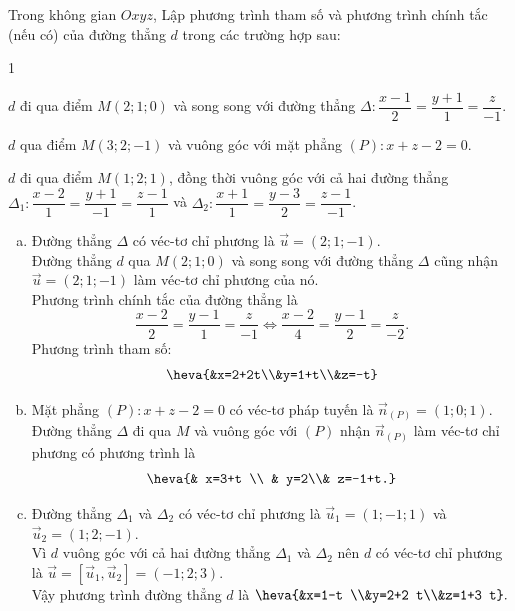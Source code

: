 \begin{vd}
	Trong không gian $Oxyz$, Lập phương trình tham số và phương trình chính tắc (nếu có) của đường thẳng $d$ trong các trường hợp sau:
	\begin{enumEX}[a)]{1}
		\item $d$ đi qua điểm $M(2;1;0)$ và song song với đường thẳng $\Delta \colon \dfrac{x-1}{2}=\dfrac{y+1}{1}=\dfrac{z}{-1}$.
		\item $d$ qua điểm $M(3;2;-1)$ và vuông góc với mặt phẳng $(P)\colon x+z-2=0$.
		\item $d$ đi qua điểm $M(1; 2; 1)$, đồng thời vuông góc với cả hai đường thẳng $\Delta_{1}\colon \dfrac{x-2}{1}=\dfrac{y+1}{-1}=\dfrac{z-1}{1}$ và $\Delta_{2}\colon \dfrac{x+1}{1}=\dfrac{y-3}{2}=\dfrac{z-1}{-1}$.
	\end{enumEX}

	\loigiai
	{
		\begin{enumerate}[a)]
			\item Đường thẳng $\Delta$ có véc-tơ chỉ phương là $\vec{u}=(2;1;-1)$.\\
			Đường thẳng $d$ qua $M(2;1;0)$ và song song với đường thẳng $\Delta$ cũng nhận $\vec{u}=(2;1;-1)$ làm véc-tơ chỉ phương của nó.\\
			Phương trình chính tắc của đường thẳng là
			\[\dfrac{x-2}{2}=\dfrac{y-1}{1}=\dfrac{z}{-1} \Leftrightarrow\dfrac{x-2}{4}=\dfrac{y-1}{2}=\dfrac{z}{-2}.\]
			Phương trình tham số:
			$$\heva{&x=2+2t\\&y=1+t\\&z=-t}$$
			\item Mặt phẳng $(P)\colon x+z-2=0$ có véc-tơ pháp tuyến là $\overrightarrow{n}_{(P)}=(1;0;1)$.\\
			Đường thẳng $\Delta$ đi qua $M$ và vuông góc với $(P)$ nhận $\overrightarrow{n}_{(P)}$ làm véc-tơ chỉ phương có phương trình là
			$$\heva{& x=3+t \\ & y=2\\& z=-1+t.}$$
			\item Đường thẳng $\Delta_{1}$ và $\Delta_{2}$ có véc-tơ chỉ phương là $\vec{u}_1 =(1;-1;1)$ và $\vec{u}_2=(1;2;-1)$.\\
			Vì $d$ vuông góc với cả hai đường thẳng $\Delta_{1}$ và $\Delta_{2}$ nên $d$ có véc-tơ chỉ phương là $\vec{u}=\left[\vec{u}_{1}, \vec{u}_{2}\right]=(-1; 2; 3)$.\\
			Vậy phương trình đường thẳng $d$ là $\heva{&x=1-t \\&y=2+2 t\\&z=1+3 t}.$
		\end{enumerate}
		
	}
\end{vd}
